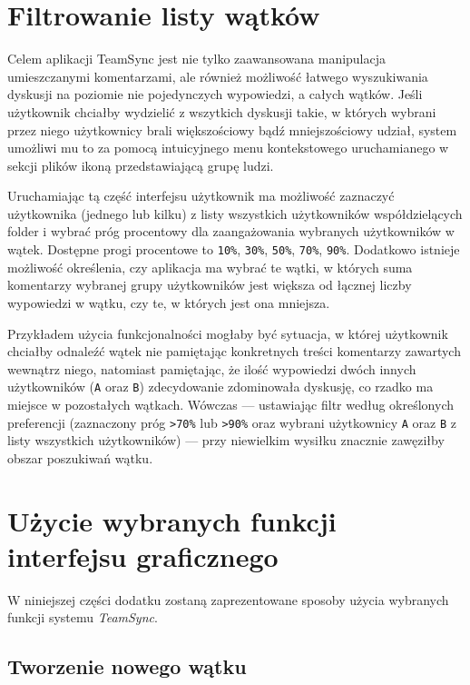 \documentclass[polish,a4paper,twoside]{ppfcmthesis}
\begin{document}
\section{Filtrowanie listy wątków}

\label{threadfiltering}

Celem aplikacji TeamSync jest nie tylko zaawansowana manipulacja umieszczanymi komentarzami, ale również możliwość łatwego wyszukiwania dyskusji na poziomie nie pojedynczych wypowiedzi, a całych wątków. Jeśli użytkownik chciałby wydzielić z wszytkich dyskusji takie, w których wybrani przez niego użytkownicy brali większościowy bądź mniejszościowy udział, system umożliwi mu to za pomocą intuicyjnego menu kontekstowego uruchamianego w sekcji plików ikoną przedstawiającą grupę ludzi.

Uruchamiając tą część interfejsu użytkownik ma możliwość zaznaczyć użytkownika (jednego lub kilku) z listy wszystkich użytkowników współdzielących folder i wybrać próg procentowy dla zaangażowania wybranych użytkowników w wątek. Dostępne progi procentowe to \texttt{10\%}, \texttt{30\%}, \texttt{50\%}, \texttt{70\%}, \texttt{90\%}. Dodatkowo istnieje możliwość określenia, czy aplikacja ma wybrać te wątki, w których suma komentarzy wybranej grupy użytkowników jest większa od łącznej liczby wypowiedzi w wątku, czy te, w których jest ona mniejsza.

Przykładem użycia funkcjonalności mogłaby być sytuacja, w której użytkownik chciałby odnaleźć wątek nie pamiętając konkretnych treści komentarzy zawartych wewnątrz niego, natomiast pamiętając, że ilość wypowiedzi dwóch innych użytkowników (\texttt{A} oraz \texttt{B}) zdecydowanie zdominowała dyskusję, co rzadko ma miejsce w pozostałych wątkach. Wówczas --- ustawiając filtr według określonych preferencji (zaznaczony próg \texttt{\textgreater 70\%} lub \texttt{\textgreater 90\%} oraz wybrani użytkownicy \texttt{A} oraz \texttt{B} z listy wszystkich użytkowników) --- przy niewielkim wysiłku znacznie zawęziłby obszar poszukiwań wątku.

\section{Użycie wybranych funkcji interfejsu graficznego}

W niniejszej części dodatku zostaną zaprezentowane sposoby użycia wybranych funkcji systemu \emph{TeamSync}.

\subsection*{Tworzenie nowego wątku}
\end{document}
